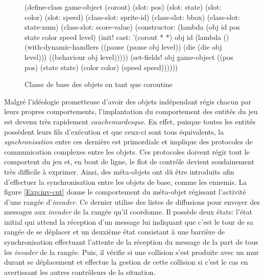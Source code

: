 \documentclass[12pt,twoside,letterpaper,francais]{book}
\newcommand{\scheme}[1]{\selectlanguage{english}{\tt #1}\selectlanguage{french}}
\begin{document}
\begin{figure}[htb!]
  \begin{schemecode}
(define-class game-object (corout)
  (slot: pos)
  (slot: state)
  (slot: color)
  (slot: speed)
  (class-slot: sprite-id)
  (class-slot: bbox)
  (class-slot: state-num)
  (class-slot: score-value)
  (constructor: (lambda (obj id pos state color speed level)
                  (init! cast: '(corout * *) obj id
                         (lambda ()(with-dynamic-handlers
                                    ((pause (pause obj level))
                                     (die   (die   obj level)))
                                    ((behaviour obj level)))))
                  (set-fields! obj game-object
                    ((pos pos)     (state state)
                     (color color) (speed speed))))))
  \end{schemecode}
  \caption{Classe de base des objets en tant que coroutine}
  \label{Exp:si3-class}
\end{figure}

Malgré l'idéologie prometteuse d'avoir des objets indépendant régis
chacun par leurs propres comportements, l'implantation du comportement
des entités du jeu est devenu très rapidement
\emph{cauchemardesque}. En effet, puisque toutes les entités possèdent
leurs fils d'exécution et que ceux-ci sont tous équivalents, la
\emph{synchronisation} entre ces dernière est primordiale et implique
des protocoles de communication complexes entre les objets. Ces
protocoles doivent régir tout le comportent du jeu et, en bout de
ligne, le flot de contrôle devient soudainement très difficile à
exprimer. Ainsi, des méta-objets ont dû être introduits afin
d'effectuer la synchronisation entre les objets de base, comme les
ennemis. La figure \ref{Exp:inv-cnt} donne le comportement du
méta-objet régissant l'activité d'une rangée d'\textit{invader}. Ce
dernier utilise des listes de diffusions pour envoyer des messages aux
\textit{invader} de la rangée qu'il coordonne. Il possède deux états:
l'état initial qui attend la réception d'un message lui indiquant que
c'est le tour de sa rangée de se déplacer et un deuxième état
consistant à une barrière de synchronisation effectuant l'attente de
la réception du message \scheme{moved} de la part de tous les
\textit{invader} de la rangée. Puis, il vérifie si une collision s'est
produite avec un mur durant se déplacement et effectue la gestion de
cette collision si c'est le cas en avertissant les autres contrôleurs
de la situation.
\end{document}
